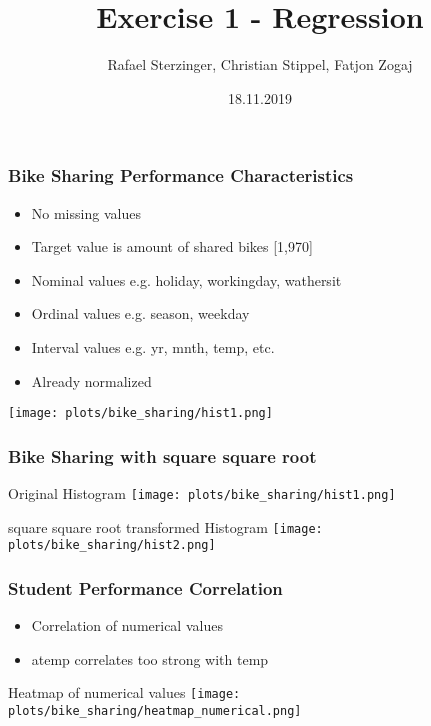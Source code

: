 \documentclass[aspectratio=169]{beamer}
\title[Your Short Title]{Exercise 1 - Regression}
\author{Rafael Sterzinger, Christian Stippel, Fatjon Zogaj}
\institute{Machine Learning}
\date{18.11.2019}
\begin{document}

\begin{frame}
  \titlepage
\end{frame}

\begin{frame}{}
\frametitle{Bike Sharing Performance Characteristics}
\begin{minipage}{0.45\textwidth}
\begin{itemize}
\item No missing values
\item Target value is amount of shared bikes [1,970]
\item Nominal values e.g. holiday, workingday, wathersit
\item Ordinal values e.g. season, weekday
\item Interval values e.g. yr, mnth, temp, etc.
\item Already normalized
\end{itemize}
\end{minipage}
\begin{minipage}{0.5\textwidth}
    \texttt{[image: plots/bike\_sharing/hist1.png]}
\end{minipage}
\end{frame}

\begin{frame}
\frametitle{Bike Sharing with square square root}
\begin{minipage}{0.49\textwidth}
	\center Original Histogram
    \texttt{[image: plots/bike\_sharing/hist1.png]}
\end{minipage}
\begin{minipage}{0.49\textwidth}
	\center square square root transformed Histogram
    \texttt{[image: plots/bike\_sharing/hist2.png]}
\end{minipage}
\end{frame}

\begin{frame}{}
\frametitle{Student Performance Correlation}
\begin{minipage}{0.3\textwidth}
\begin{itemize}
\item Correlation of numerical values
\item atemp correlates too strong with temp
\end{itemize}
\end{minipage}
\begin{minipage}{0.69\textwidth}
	\center Heatmap of numerical values
    \texttt{[image: plots/bike\_sharing/heatmap\_numerical.png]}
\end{minipage}
\end{frame}
\end{document}
